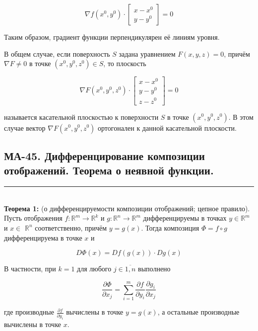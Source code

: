 \documentclass[a4paper,12pt]{article} %
\newcommand{\HRule}{\rule{\linewidth}{0.5mm}}
\begin{document}
$$
\nabla f\left(x^{0}, y^{0}\right) \cdot\left[\begin{array}{l}
x-x^{0} \\
y-y^{0}
\end{array}\right]=0
$$

Таким образом, градиент функции перпендикулярен её линиям уровня.

В общем случае, если поверхность $S$ задана уравнением $F(x, y, z)=0$, причём $\nabla F \neq 0$ в точке $\left(x^{0}, y^{0}, z^{0}\right) \in S$, то плоскость

$$
\nabla F\left(x^{0}, y^{0}, z^{0}\right) \cdot\left[\begin{array}{l}
x-x^{0} \\
y-y^{0} \\
z-z^{0}
\end{array}\right]=0
$$

называется касательной плоскостью к поверхности $S$ в точке $\left(x^{0}, y^{0}, z^{0}\right)$. В этом случае вектор $\nabla F\left(x^{0}, y^{0}, z^{0}\right)$ ортогонален к данной касательной плоскости.



\newpage
\begin{LARGE}
\begin{center}
	\section{МА-45. Дифференцирование композиции отображений. Теорема о неявной функции. }
\end{center}
\end{LARGE}
\HRule \\


\textbf{Теорема 1:} (о дифференцируемости композиции отображений; цепное правило). Пусть отображения $f: \mathbb{R}^{m} \rightarrow \mathbb{R}^{k}$ и $g: \mathbb{R}^{n} \rightarrow \mathbb{R}^{m}$ дифференцируемы в точках $y \in \mathbb{R}^{m}$ и $x \in$ $\mathbb{R}^{n}$ соответственно, причём $y=g(x)$. Тогда композиция $\Phi=f \circ g$ дифференцируема в точке $x$ и

$$
D \Phi(x)=D f(g(x)) \cdot D g(x)
$$

В частности, при $k=1$ для любого $j \in \overline{1, n}$ выполнено

$$
\frac{\partial \Phi}{\partial x_{j}}=\sum_{i=1}^{m} \frac{\partial f}{\partial y_{i}} \frac{\partial g_{i}}{\partial x_{j}}
$$

где производные $\frac{\partial f}{\partial y_{i}}$ вычислены в точке $y=g(x)$, а остальные производные вычислены в точке $x$.
\end{document}
